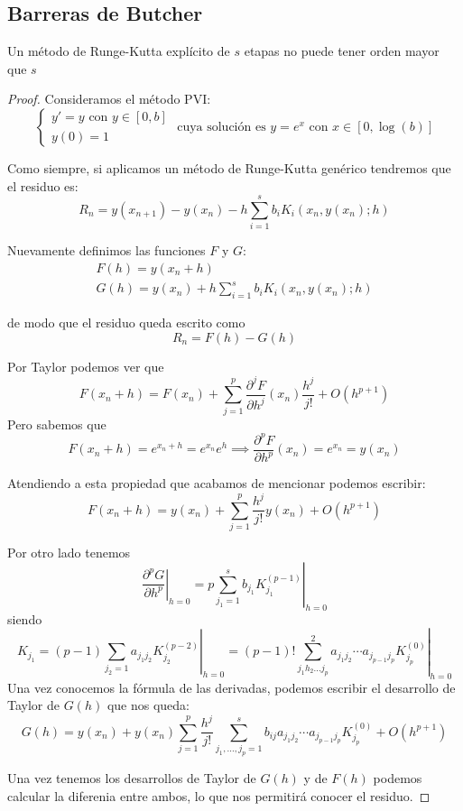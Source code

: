 \subsection{Barreras de Butcher}
\begin{theorem}
Un método de Runge-Kutta explícito de $s$ etapas no puede tener orden mayor que $s$
\end{theorem}
\begin{proof}
Consideramos el método PVI:
\[\left\{\begin{array}{l}
y'=y \text{ con } y\in [0,b]\\
y(0)=1
\end{array}\right.\text{ cuya solución es } y=e^x \text{ con } x\in [0,\log(b)]\]

Como siempre, si aplicamos un método de Runge-Kutta genérico tendremos que el residuo es:
\[R_n=y(x_{n+1})-y(x_n)-h\sum_{i=1}^sb_iK_i(x_n,y(x_n);h)\]

Nuevamente definimos las funciones $F$ y $G$:
\[\begin{array}{l}
F(h) = y(x_n+h)\\
G(h) = y(x_n)+h \sum_{i=1}^sb_iK_i(x_n,y(x_n);h)
\end{array}\]

de modo que el residuo queda escrito como
\[R_n=F(h)-G(h)\]

Por Taylor podemos ver que
\[F(x_n+h)=F(x_n)+\sum_{j=1}^p\frac{\partial^j F}{\partial h^j}(x_n)\frac{h^j}{j!} + O(h^{p+1})\]
Pero sabemos que
\[F(x_n+h)=e^{x_n+h}=e^{x_n}e^h \implies \frac{\partial^p F}{\partial h^p}(x_n)=e^{x_n}=y(x_n)\]

Atendiendo a esta propiedad que acabamos de mencionar podemos escribir:
\[F(x_n+h)=y(x_n)+\sum_{j=1}^p \frac{h^j}{j!}y(x_n) + O(h^{p+1})\]

Por otro lado tenemos
\[\left.\frac{\partial^p G}{\partial h^p}\right|_{h=0} = \left. p\sum_{j_1=1}^sb_{j_1}K_{j_1}^{(p-1)}\right|_{h=0}\]
siendo
\[K_{j_1}=\left.(p-1)\sum_{j_2=1}a_{j_1j_2}K_{j_2}^{(p-2)}\right|_{h=0} = \left.(p-1)!\sum_{j_1h_2...j_p}^2a_{j_1j_2}\cdots a_{j_{p-1}j_p} K_{j_p}^{(0)}\right|_{h=0}\]
Una vez conocemos la fórmula de las derivadas, podemos escribir el desarrollo de Taylor de $G(h)$ que nos queda:
\[G(h)=y(x_n)+y(x_n)\sum_{j=1}^p\frac{h^j}{j!}\sum_{j_1,...,j_p=1}^sb_{ij}a_{j_1j_2}\cdots a_{j_{p-1}j_p}K_{j_p}^{(0)} + O(h^{p+1})\]

Una vez tenemos los desarrollos de Taylor de $G(h)$ y de $F(h)$ podemos calcular la diferenia entre ambos, lo que nos permitirá conocer el residuo.


\end{proof}
